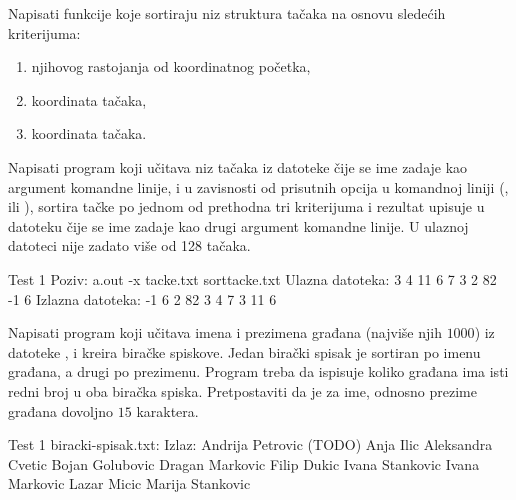 \begin{Exercise}[label=508]
  Napisati funkcije koje sortiraju niz struktura tačaka na
  osnovu sledećih kriterijuma:
  \begin{enumerate}
  \item njihovog rastojanja od koordinatnog početka,
  \item {} koordinata tačaka,
  \item {} koordinata tačaka.
  \end{enumerate}
  Napisati program koji učitava niz tačaka iz datoteke čije se ime
  zadaje kao argument komandne linije, i u zavisnosti od prisutnih
  opcija u komandnoj liniji (,  ili ),
  sortira tačke po jednom od prethodna tri kriterijuma i rezultat
  upisuje u datoteku čije se ime zadaje kao drugi argument komandne
  linije. U ulaznoj datoteci nije zadato više od 128 tačaka.
  
\begin{miditest}
\begin{test}{Test 1}
Poziv:  a.out -x tacke.txt sorttacke.txt
Ulazna datoteka:
3 4
11 6
7 3
2 82
-1 6
Izlazna datoteka:
-1 6
2 82
3 4
7 3
11 6
\end{test}
\end{miditest}
  
\end{Exercise}

\begin{Exercise}[label=509]
  Napisati program koji učitava imena i prezimena građana (najviše
  njih $1000$) iz datoteke , i kreira
  biračke spiskove. Jedan birački spisak je sortiran po imenu građana,
  a drugi po prezimenu. Program treba da ispisuje koliko građana ima
  isti redni broj u oba biračka spiska. Pretpostaviti da je za ime,
  odnosno prezime građana dovoljno $15$ karaktera.

\begin{miditest}
\begin{test}{Test 1}
biracki-spisak.txt:      Izlaz:
Andrija Petrovic         (TODO)
Anja Ilic
Aleksandra Cvetic
Bojan Golubovic
Dragan Markovic
Filip Dukic
Ivana Stankovic
Ivana Markovic
Lazar Micic
Marija Stankovic    
\end{test}
\end{miditest}
  
\end{Exercise}

